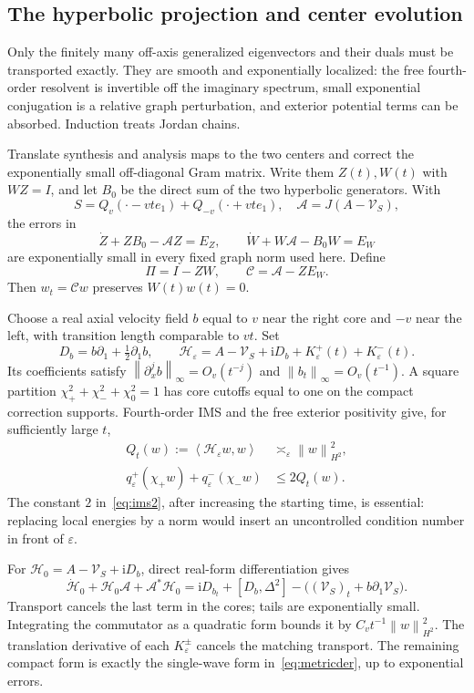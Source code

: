 \documentclass[11pt,a4paper]{article}
\theoremstyle{remark}\newtheorem{remark}[theorem]{Remark}
\newcommand{\ii}{\mathrm i}\newcommand{\dd}{\,\mathrm d}
\newcommand{\norm}[1]{\left\|#1\right\|}
\newcommand{\ip}[2]{\left\langle #1,#2\right\rangle}
\begin{document}
\subsection{The hyperbolic projection and center evolution}
Only the finitely many off-axis generalized eigenvectors and their duals must be transported exactly. They are smooth and exponentially localized: the free fourth-order resolvent is invertible off the imaginary spectrum, small exponential conjugation is a relative graph perturbation, and exterior potential terms can be absorbed. Induction treats Jordan chains.

Translate synthesis and analysis maps to the two centers and correct the exponentially small off-diagonal Gram matrix. Write them $Z(t),W(t)$ with $WZ=I$, and let $B_0$ be the direct sum of the two hyperbolic generators. With
\[
 S=Q_v(\cdot-vte_1)+Q_{-v}(\cdot+vte_1),\quad
 \mathcal A=J(A-\mathcal V_S),
\]
the errors in
\[
 \dot Z+ZB_0-\mathcal AZ=E_Z,\qquad
 \dot W+W\mathcal A-B_0W=E_W
\]
are exponentially small in every fixed graph norm used here. Define
\[
 \Pi=I-ZW,\qquad\mathcal C=\mathcal A-ZE_W.
\]
Then $w_t=\mathcal Cw$ preserves $W(t)w(t)=0$.

Choose a real axial velocity field $b$ equal to $v$ near the right core and $-v$ near the left, with transition length comparable to $vt$. Set
\[
 D_b=b\partial_1+\tfrac12\partial_1b,\qquad
 \mathcal H_\varepsilon=A-\mathcal V_S+\ii D_b
                         +K_\varepsilon^+(t)+K_\varepsilon^-(t).
\]
Its coefficients satisfy $\norm{\partial_x^jb}_\infty=O_v(t^{-j})$ and $\norm{b_t}_\infty=O_v(t^{-1})$. A square partition $\chi_+^2+\chi_-^2+\chi_0^2=1$ has core cutoffs equal to one on the compact correction supports. Fourth-order IMS and the free exterior positivity give, for sufficiently large $t$,
\begin{align}
 Q_t(w):=\ip{\mathcal H_\varepsilon w}{w}&\asymp_\varepsilon\norm w_{H^2}^2,\label{eq:ims1}\\
 q_\varepsilon^+(\chi_+w)+q_\varepsilon^-(\chi_-w)&\le2Q_t(w).\label{eq:ims2}
\end{align}
The constant $2$ in~\eqref{eq:ims2}, after increasing the starting time, is essential: replacing local energies by a norm would insert an uncontrolled condition number in front of $\varepsilon$.

For $\mathcal H_0=A-\mathcal V_S+\ii D_b$, direct real-form differentiation gives
\begin{equation}\label{eq:comm}
 \dot{\mathcal H}_0+\mathcal H_0\mathcal A+\mathcal A^*\mathcal H_0
 =\ii D_{b_t}+[D_b,\Delta^2]-\bigl((\mathcal V_S)_t+b\partial_1\mathcal V_S\bigr).
\end{equation}
Transport cancels the last term in the cores; tails are exponentially small. Integrating the commutator as a quadratic form bounds it by $C_vt^{-1}\norm w_{H^2}^2$. The translation derivative of each $K_\varepsilon^\pm$ cancels the matching transport. The remaining compact form is exactly the single-wave form in~\eqref{eq:metricder}, up to exponential errors.
\end{document}
